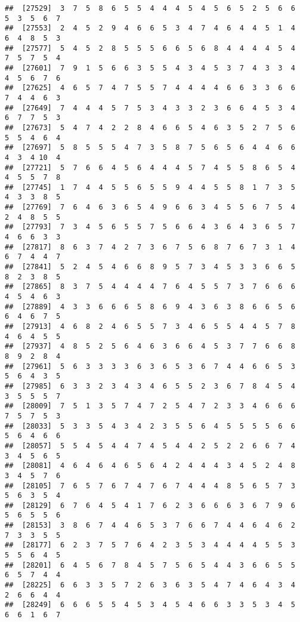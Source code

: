 \documentclass[
]{book}
\begin{document}
\begin{verbatim}
##  [27529]  3  7  5  8  6  5  5  4  4  4  5  4  5  6  5  2  5  6  6  5  3  5  6  7
##  [27553]  2  4  5  2  9  4  6  6  5  3  4  7  4  6  4  4  5  1  4  6  4  8  5  3
##  [27577]  5  4  5  2  8  5  5  5  6  6  5  6  8  4  4  4  4  5  4  7  5  7  5  4
##  [27601]  7  9  1  5  6  6  3  5  5  4  3  4  5  3  7  4  3  3  4  4  5  6  7  6
##  [27625]  4  6  5  7  4  7  5  5  7  4  4  4  4  6  6  3  3  6  6  7  4  4  6  3
##  [27649]  7  4  4  4  5  7  5  3  4  3  3  2  3  6  6  4  5  3  4  6  7  7  5  3
##  [27673]  5  4  7  4  2  2  8  4  6  6  5  4  6  3  5  2  7  5  6  5  5  4  6  4
##  [27697]  5  8  5  5  5  4  7  3  5  8  7  5  6  5  6  4  4  6  6  4  3  4 10  4
##  [27721]  5  7  6  6  4  5  6  4  4  4  5  7  4  5  5  8  6  5  4  4  5  5  7  8
##  [27745]  1  7  4  4  5  5  6  5  5  9  4  4  5  5  8  1  7  3  5  4  3  3  8  5
##  [27769]  7  6  4  6  3  6  5  4  9  6  6  3  4  5  5  6  7  5  4  2  4  8  5  5
##  [27793]  7  3  4  5  6  5  5  7  5  6  6  4  3  6  4  3  6  5  7  4  6  6  3  3
##  [27817]  8  6  3  7  4  2  7  3  6  7  5  6  8  7  6  7  3  1  4  6  7  4  4  7
##  [27841]  5  2  4  5  4  6  6  8  9  5  7  3  4  5  3  3  6  6  5  8  2  3  8  5
##  [27865]  8  3  7  5  4  4  4  4  7  6  4  5  5  7  3  7  6  6  6  4  5  4  6  3
##  [27889]  4  3  3  6  6  6  5  8  6  9  4  3  6  3  8  6  6  5  6  6  4  6  7  5
##  [27913]  4  6  8  2  4  6  5  5  7  3  4  6  5  5  4  4  5  7  8  4  6  4  5  5
##  [27937]  4  8  5  2  5  6  4  6  3  6  6  4  5  3  7  7  6  6  8  8  9  2  8  4
##  [27961]  5  6  3  3  3  3  6  3  6  5  3  6  7  4  4  6  6  5  3  5  6  4  3  5
##  [27985]  6  3  3  2  3  4  3  4  6  5  5  2  3  6  7  8  4  5  4  3  5  5  5  7
##  [28009]  7  5  1  3  5  7  4  7  2  5  4  7  2  3  3  4  6  6  6  7  5  7  5  3
##  [28033]  5  3  3  5  4  3  4  2  3  5  5  6  4  5  5  5  5  6  6  5  6  4  6  6
##  [28057]  5  5  4  5  4  4  7  4  5  4  4  2  5  2  2  6  6  7  4  3  4  5  6  5
##  [28081]  4  6  4  6  4  6  5  6  4  2  4  4  4  3  4  5  2  4  8  3  4  5  7  6
##  [28105]  7  6  5  7  6  7  4  7  6  7  4  4  4  8  5  6  5  7  3  5  6  3  5  4
##  [28129]  6  7  6  4  5  4  1  7  6  2  3  6  6  6  3  6  7  9  6  5  6  5  5  6
##  [28153]  3  8  6  7  4  4  6  5  3  7  6  6  7  4  4  6  4  6  2  7  3  3  5  5
##  [28177]  6  2  3  7  5  7  6  4  2  3  5  3  4  4  4  4  5  5  3  5  5  6  4  5
##  [28201]  6  4  5  6  7  8  4  5  7  5  6  5  4  4  3  6  6  5  5  6  5  7  4  4
##  [28225]  6  6  3  3  5  7  2  6  3  6  3  5  4  7  4  6  4  3  4  2  6  6  4  4
##  [28249]  6  6  6  5  5  4  5  3  4  5  4  6  6  3  3  5  3  4  5  6  6  1  6  7

\end{verbatim}
\end{document}
